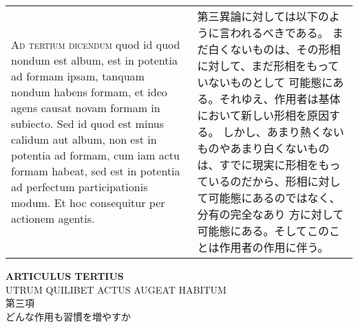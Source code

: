 \documentclass[10pt]{jsarticle} %
\begin{document}
\begin{longtable}{p{21em}p{21em}}
\\



{\scshape Ad tertium dicendum} quod id quod nondum est album, est in potentia ad
formam ipsam, tanquam nondum habens formam, et ideo agens causat novam
formam in subiecto. Sed id quod est minus calidum aut album, non est
in potentia ad formam, cum iam actu formam habeat, sed est in potentia
ad perfectum participationis modum. Et hoc consequitur per actionem
agentis.


&

第三異論に対しては以下のように言われるべきである。
まだ白くないものは、その形相に対して、まだ形相をもっていないものとして
可能態にある。それゆえ、作用者は基体において新しい形相を原因する。
しかし、あまり熱くないものやあまり白くないものは、すでに現実に形相をもっ
 ているのだから、形相に対して可能態にあるのではなく、分有の完全なあり
 方に対して可能態にある。そしてこのことは作用者の作用に伴う。


\end{longtable}
\newpage

\begin{center}
{\Large {\bf ARTICULUS TERTIUS}}\\
{\large UTRUM QUILIBET ACTUS AUGEAT HABITUM}\\
{\Large 第三項\\どんな作用も習慣を増やすか}
\end{center}
\end{document}

